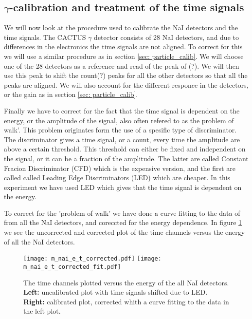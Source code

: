 \documentclass[11pt,a4wide]{article}
\begin{document}
\subsection{$\gamma$-calibration and treatment of the time signals}
We will now look at the procedure used to calibrate the NaI detectors and the time signals. The CACTUS $\gamma$ detector consists of 28 NaI detectors, and due to differences in the electronics the time signals are not aligned. To correct for this we will use a similar procedure as in section \ref{sec: particle_calib}. We will choose one of the 28 detectors as a reference and read of the peak of (?). We will then use this peak to shift the count(?) peaks for all the other detectors so that all the peaks are aligned. We will also account for the different responce in the detectors, or the gain as in section \ref{sec: particle_calib}.

Finally we have to correct for the fact that the time signal is dependent on the energy, or the amplitude of the signal, also often refered to as the problem of walk'. This problem originates form the use of a spesific type of discriminator. The discriminator gives a time signal, or a count, every time the amplitude are above a certain threshold. This threshold can either be fixed and independent on the signal, or it can be a fraction of the amplitude. The latter are called Constant Fracion Discriminator (CFD) which is the expensive version, and the first are called called Leading Edge Discriminators (LED) which are cheaper. In this experiment we have used LED which gives that the time signal is dependent on the energy. 

To correct for the 'problem of walk' we have done a curve fitting to the data of from all the NaI detectors, and coreccted for the energy dependence. In figure \ref{fig: time_corr} we see the uncorrected and corrected plot of the time channels versus the energy of all the NaI detectors.

\begin{figure}[htp]
\centering
\texttt{[image: m\_nai\_e\_t\_corrected.pdf]}
\texttt{[image: m\_nai\_e\_t\_corrected\_fit.pdf]}
\caption{The time channels plotted versus the energy of the all NaI detectors. \textbf{Left:} uncalibrated plot with time signals shifted due to LED. \textbf{Right:} calibrated plot, corrected whith a curve fitting to the data in the left plot.}
\label{fig: time_corr}
\end{figure}
\end{document}

